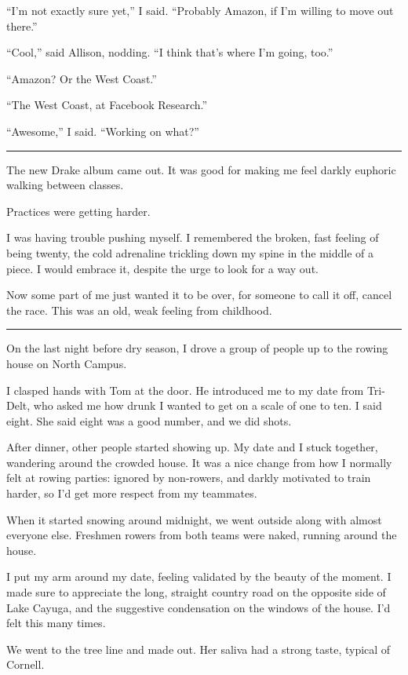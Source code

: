 ``I'm not exactly sure yet,'' I said.  ``Probably Amazon, if I'm willing to move
out there.''

``Cool,'' said Allison, nodding.  ``I think that's where I'm going, too.''

``Amazon?  Or the West Coast.''

``The West Coast, at Facebook Research.''

``Awesome,'' I said.  ``Working on what?''

\plainfancybreak{12pt}{2}{}

The new Drake album came out.  It was good for making me feel darkly euphoric
walking between classes.

Practices were getting harder.

I was having trouble pushing myself.  I remembered the broken, fast feeling of
being twenty, the cold adrenaline trickling down my spine in the middle of a
piece.  I would embrace it, despite the urge to look for a way out.  

Now some part of me just wanted it to be over, for someone to call it off,
cancel the race.  This was an old, weak feeling from childhood. 

\plainfancybreak{12pt}{2}{}

On the last night before dry season, I drove a group of people up to the rowing
house on North Campus.

I clasped hands with Tom at the door.  He introduced me to my date from
Tri-Delt, who asked me how drunk I wanted to get on a scale of one to ten. I
said eight.  She said eight was a good number, and we did shots.  

After dinner, other people started showing up.  My date and I stuck together,
wandering around the crowded house.  It was a nice change from how I normally
felt at rowing parties: ignored by non-rowers, and darkly motivated to train
harder, so I'd get more respect from my teammates.

When it started snowing around midnight, we went outside along with almost
everyone else.  Freshmen rowers from both teams were naked, running around the
house.

I put my arm around my date, feeling validated by the beauty of the moment.  I
made sure to appreciate the long, straight country road on the opposite side of
Lake Cayuga, and the suggestive condensation on the windows of the house.  I'd
felt this many times. 

We went to the tree line and made out.  Her saliva had a strong taste, typical
of Cornell.

